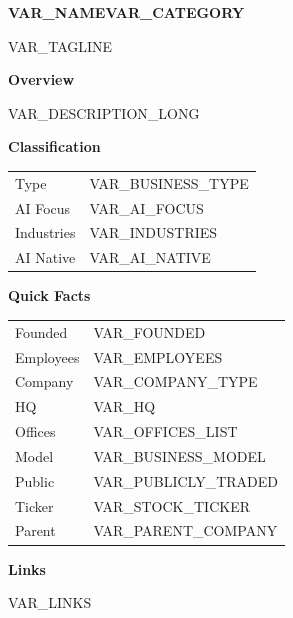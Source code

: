 \documentclass[a4paper,9pt]{article}
\newcommand{\sectionhead}[1]{%
  \vspace{3pt}%
  {\color{accent}\bfseries\small #1}%
  \vspace{1pt}%
  \par\nobreak%
}
\begin{document}
\noindent\hspace*{-1.2cm}\colorbox{accent}{\parbox{\dimexpr\paperwidth\relax}{\hspace{1.2cm}\parbox{\dimexpr\textwidth\relax}{%
\vspace{8pt}%
{\color{white}\fontsize{28}{32}\selectfont\bfseries VAR_NAME\hfill{\small VAR_CATEGORY}}%
\vspace{4pt}\par%
{\color{white!85}\footnotesize VAR_TAGLINE}%
\vspace{8pt}%
}}}\par\vspace{6pt}

\begin{minipage}[t]{0.62\textwidth}
\sectionhead{Overview}
{\footnotesize VAR_DESCRIPTION_LONG}

\sectionhead{Classification}
{\footnotesize
\begin{tabularx}{\textwidth}{@{}lX@{}}
\textcolor{muted}{Type} & VAR_BUSINESS_TYPE \\
\textcolor{muted}{AI Focus} & VAR_AI_FOCUS \\
\textcolor{muted}{Industries} & VAR_INDUSTRIES \\
\textcolor{muted}{AI Native} & VAR_AI_NATIVE \\
\end{tabularx}}
\end{minipage}%
\hfill%
\begin{minipage}[t]{0.34\textwidth}
\sectionhead{Quick Facts}
{\footnotesize
\begin{tabularx}{\textwidth}{@{}lX@{}}
\textcolor{muted}{Founded} & VAR_FOUNDED \\
\textcolor{muted}{Employees} & VAR_EMPLOYEES \\
\textcolor{muted}{Company} & VAR_COMPANY_TYPE \\
\textcolor{muted}{HQ} & VAR_HQ \\
\textcolor{muted}{Offices} & VAR_OFFICES_LIST \\
\textcolor{muted}{Model} & VAR_BUSINESS_MODEL \\
\textcolor{muted}{Public} & VAR_PUBLICLY_TRADED \\
\textcolor{muted}{Ticker} & VAR_STOCK_TICKER \\
\textcolor{muted}{Parent} & VAR_PARENT_COMPANY \\
\end{tabularx}}

\sectionhead{Links}
{\footnotesize VAR_LINKS}
\end{minipage}
\end{document}
